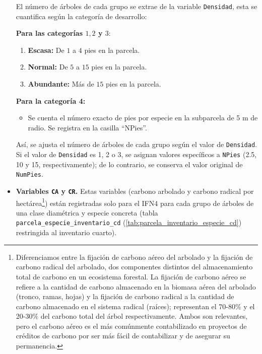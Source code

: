 \begin{itemize}
    El número de árboles de cada grupo se extrae de la variable \texttt{Densidad}, esta se cuantifica según la categoría de desarrollo:
    
    \medskip
    
    \textbf{Para las categorías $1, 2$ y $3$}:
    \begin{enumerate}
        \item \textbf{Escasa:} De $1$ a $4$ pies en la parcela.
        \item \textbf{Normal:} De $5$ a $15$ pies en la parcela.
        \item \textbf{Abundante:} Más de $15$ pies en la parcela.
    
    \medskip
    
    \end{enumerate}
    \textbf{Para la categoría 4:}
    \begin{itemize}
        \item Se cuenta el número exacto de pies por especie en la subparcela de 5 m de radio. Se registra en la casilla ``NPies''.
    \end{itemize}
    
    \medskip
    
    Así, se ajusta el número de árboles de cada grupo según el valor de \texttt{Densidad}. Si el valor de \texttt{Densidad} es 1, 2 o 3, se asignan valores específicos a \texttt{NPies} (2.5, 10 y 15, respectivamente); de lo contrario, se conserva el valor original de \texttt{NumPies}.
    
    \medskip

    \item \textbf{Variables \texttt{CA} y \texttt{CR}.} Estas variables (carbono arbolado y carbono radical por hectárea\footnote{Diferenciamos entre la fijación de carbono aéreo del arbolado y la fijación de carbono radical del arbolado, dos componentes distintos del almacenamiento total de carbono en un ecosistema forestal. La fijación de carbono aéreo se refiere a la cantidad de carbono almacenado en la biomasa aérea del arbolado (tronco, ramas, hojas) y la fijación de carbono radical a la cantidad de carbono almacenado en el sistema radical (raíces); representan el 70-80\% y el 20-30\% del carbono total del árbol respectivamente. Ambos son relevantes, pero el carbono aéreo es el más comúnmente contabilizado en proyectos de créditos de carbono por ser más fácil de contabilizar y de asegurar su permanencia. }) están registradas solo para el IFN4 para cada grupo de árboles de una clase diamétrica y especie concreta (tabla \texttt{parcela\_especie\_inventario\_cd} (\ref{tab:parcela_inventario_especie_cd}) restringida al inventario cuarto).
    \medskip


\end{itemize}
